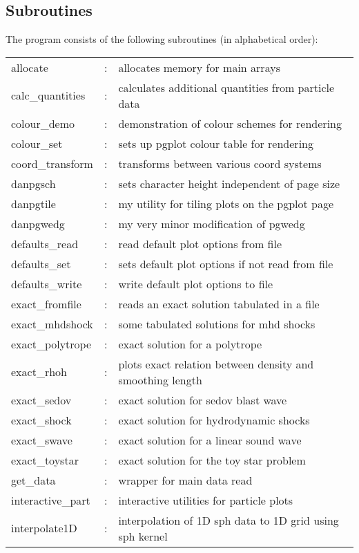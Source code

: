 \documentclass[a4paper,12pt]{article}
\begin{document}
\subsection{Subroutines}
The program consists of the following subroutines (in alphabetical order):
\begin{tabular}{lcp{}}
allocate           & : & allocates memory for main arrays \\
calc\_quantities    & : & calculates additional quantities from particle data\\
colour\_demo        & : & demonstration of colour schemes for rendering\\
colour\_set	 & : & sets up pgplot colour table for rendering\\
coord\_transform    & : & transforms between various coord systems\\
danpgsch           & : & sets character height independent of page size\\
danpgtile          & : & my utility for tiling plots on the pgplot page\\
danpgwedg          & : & my very minor modification of pgwedg\\
defaults\_read	 & : & read default plot options from file\\
defaults\_set	 & : & sets default plot options if not read from file\\
defaults\_write	 & : & write default plot options to file\\
exact\_fromfile     & : & reads an exact solution tabulated in a file\\
exact\_mhdshock     & : & some tabulated solutions for mhd shocks \\
exact\_polytrope    & : & exact solution for a polytrope\\
exact\_rhoh	 & : & plots exact relation between density and smoothing length\\
exact\_sedov        & : & exact solution for sedov blast wave\\
exact\_shock        & : & exact solution for hydrodynamic shocks\\
exact\_swave        & : & exact solution for a linear sound wave\\
exact\_toystar      & : & exact solution for the toy star problem\\
get\_data           & : & wrapper for main data read\\
interactive\_part   & : & interactive utilities for particle plots\\
interpolate1D	 & : & interpolation of 1D sph data to 1D grid using sph kernel\\

\end{tabular}
\end{document}
